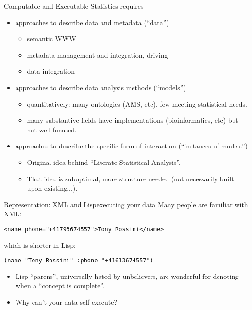 \documentclass{beamer}
\begin{document}
\begin{frame}{Computable and Executable Statistics requires}

  \begin{itemize}
  \item approaches to describe data and metadata (``data'')
    \begin{itemize}
    \item semantic WWW
    \item metadata management and integration, driving
    \item data integration
    \end{itemize}
  \item approaches to describe data analysis methods (``models'')
    \begin{itemize}
    \item quantitatively: many ontologies (AMS, etc), few meeting
      statistical needs.
    \item many substantive fields have implementations
      (bioinformatics, etc) but not well focused.
    \end{itemize}
  \item approaches to describe the specific form of interaction
    (``instances of models'')
    \begin{itemize}
    \item Original idea behind ``Literate Statistical Analysis''.
    \item That idea is suboptimal, more structure needed (not
      necessarily built upon existing...).
    \end{itemize}
  \end{itemize}
\end{frame}

\begin{frame}[fragile]{Representation: XML and Lisp}{executing your data}
  Many people are familiar with XML: 
\begin{verbatim}
<name phone="+41793674557">Tony Rossini</name>
\end{verbatim}
  which is shorter in Lisp:
\begin{verbatim}
(name "Tony Rossini" :phone "+41613674557")
\end{verbatim}
  \begin{itemize}
  \item Lisp ``parens'', universally hated by unbelievers, are
    wonderful for denoting when a ``concept is complete''.
  \item Why can't your data self-execute?
  \end{itemize}
\end{frame}
\end{document}
